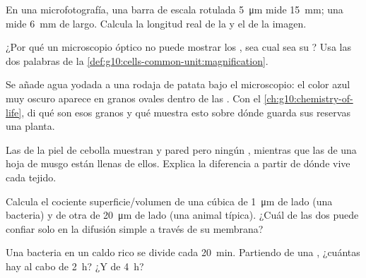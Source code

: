 \begin{exercise}[$\star\star$]\label{exo:g10:cells-common-unit:6}
En una microfotografía, una barra de escala rotulada \qty{5}{\micro m}
mide \qty{15}{mm}; una  mide \qty{6}{mm} de largo. Calcula
la longitud real de la  y el  de la imagen.
\end{exercise}

\begin{exercise}[$\star\star$]\label{exo:g10:cells-common-unit:7}
¿Por qué un microscopio óptico no puede mostrar los , sea cual
sea su ? Usa las dos palabras de la
\cref{def:g10:cells-common-unit:magnification}.
\end{exercise}

\begin{exercise}[$\star\star$]\label{exo:g10:cells-common-unit:8}
Se añade agua yodada a una rodaja de patata bajo el microscopio: el
color azul muy oscuro aparece en granos ovales dentro de las .
Con el \cref{ch:g10:chemistry-of-life}, di qué son esos granos y qué
muestra esto sobre dónde guarda sus reservas una planta.
\end{exercise}

\begin{exercise}[$\star\star$]\label{exo:g10:cells-common-unit:9}
Las  de la piel de cebolla muestran  y pared pero ningún
, mientras que las de una hoja de musgo están llenas de
ellos. Explica la diferencia a partir de dónde vive cada tejido.
\end{exercise}

\begin{exercise}[$\star\star$]\label{exo:g10:cells-common-unit:10}
Calcula el cociente superficie/volumen de una  cúbica de
\qty{1}{\micro m} de lado (una bacteria) y de otra de
\qty{20}{\micro m} de lado (una  animal típica). ¿Cuál de las dos
puede confiar solo en la difusión simple a través de su membrana?
\end{exercise}

\begin{exercise}[$\star\star$]\label{exo:g10:cells-common-unit:11}
Una bacteria en un caldo rico se divide cada \qty{20}{min}. Partiendo
de una , ¿cuántas hay al cabo de \qty{2}{h}? ¿Y de \qty{4}{h}?
\end{exercise}


